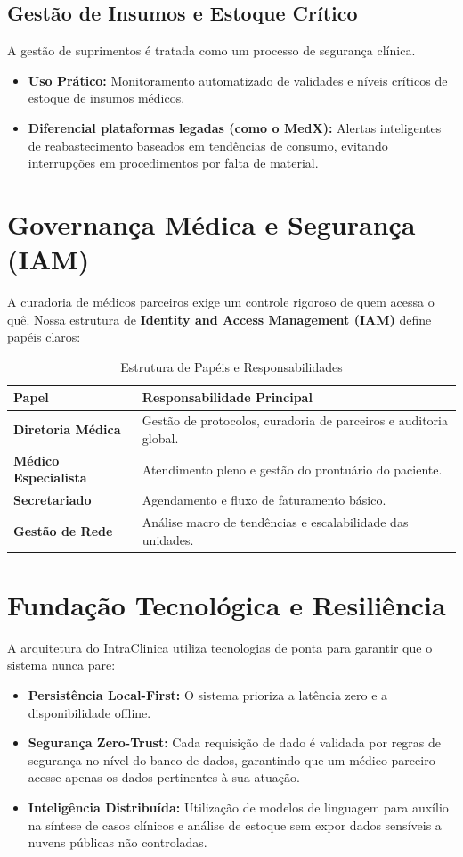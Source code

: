 \documentclass[12pt,a4paper]{article}
\begin{document}
\subsection{Gestão de Insumos e Estoque Crítico}
A gestão de suprimentos é tratada como um processo de segurança clínica.
\begin{itemize}
    \item \textbf{Uso Prático:} Monitoramento automatizado de validades e níveis críticos de estoque de insumos médicos.
    \item \textbf{Diferencial plataformas legadas (como o MedX):} Alertas inteligentes de reabastecimento baseados em tendências de consumo, evitando interrupções em procedimentos por falta de material.
\end{itemize}

\section{Governança Médica e Segurança (IAM)}
A curadoria de médicos parceiros exige um controle rigoroso de quem acessa o quê. Nossa estrutura de \textbf{Identity and Access Management (IAM)} define papéis claros:

\begin{table}[h]
\centering
\caption{Estrutura de Papéis e Responsabilidades}
\begin{tabular}{@{}ll@{}}
\toprule
\textbf{Papel} & \textbf{Responsabilidade Principal} \\ \midrule
\textbf{Diretoria Médica} & Gestão de protocolos, curadoria de parceiros e auditoria global. \\
\textbf{Médico Especialista} & Atendimento pleno e gestão do prontuário do paciente. \\
\textbf{Secretariado} & Agendamento e fluxo de faturamento básico. \\
\textbf{Gestão de Rede} & Análise macro de tendências e escalabilidade das unidades. \\ \bottomrule
\end{tabular}
\end{table}

\section{Fundação Tecnológica e Resiliência}
A arquitetura do IntraClinica utiliza tecnologias de ponta para garantir que o sistema nunca pare:
\begin{itemize}
    \item \textbf{Persistência Local-First:} O sistema prioriza a latência zero e a disponibilidade offline.
    \item \textbf{Segurança Zero-Trust:} Cada requisição de dado é validada por regras de segurança no nível do banco de dados, garantindo que um médico parceiro acesse apenas os dados pertinentes à sua atuação.
    \item \textbf{Inteligência Distribuída:} Utilização de modelos de linguagem para auxílio na síntese de casos clínicos e análise de estoque sem expor dados sensíveis a nuvens públicas não controladas.
\end{itemize}
\end{document}
